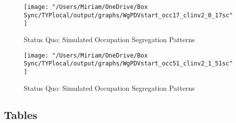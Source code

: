 \documentclass[11pt]{article}
\begin{document}
% 

\begin{figure}[H]
\centering
\caption{Status Quo: Simulated Occupation Segregation Patterns}
\label{nurses}
\texttt{[image: "/Users/Miriam/OneDrive/Box Sync/TYPlocal/output/graphs/WgPDVstart\_occ17\_clinv2\_0\_17sc"]}
\end{figure}
\begin{figure}[H]
\centering
\caption{Status Quo: Simulated Occupation Segregation Patterns}
\label{mechanics}
\texttt{[image: "/Users/Miriam/OneDrive/Box Sync/TYPlocal/output/graphs/WgPDVstart\_occ51\_clinv2\_1\_51sc"]}
\end{figure}


\newpage
\subsection{Tables}



%
%



%



%




\label{FEs}



\clearpage
\newpage

\clearpage 
\newpage
\end{document}
